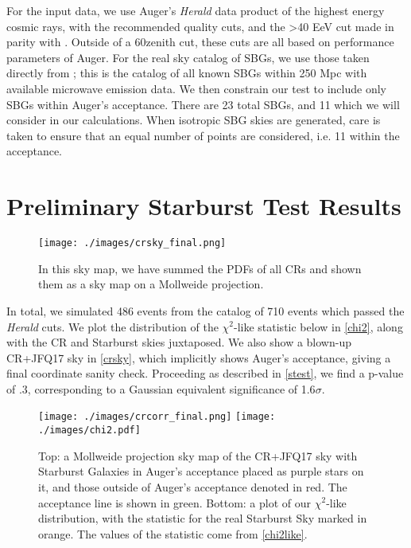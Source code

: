For the input data, we use Auger's \textit{Herald} data product of the highest energy cosmic rays, with the recommended quality cuts, and the \textgreater 40 EeV cut made in parity with . Outside of a 60\degree zenith cut, these cuts are all based on performance parameters of Auger. For the real sky catalog of SBGs, we use those taken directly from \textcite{starburst}; this is the catalog of all known SBGs within 250 Mpc with available microwave emission data. We then constrain our test to include only SBGs within Auger's acceptance. There are 23 total SBGs, and 11 which we will consider in our calculations. When isotropic SBG skies are generated, care is taken to ensure that an equal number of points are considered, i.e. 11 within the acceptance.
%
 
\section{Preliminary Starburst Test Results}%
\begin{figure}[H]
\centering
\texttt{[image: ./images/crsky\_final.png]}
\caption[CR Sky + JFQ17 Modulation]{In this sky map, we have summed the PDFs of all CRs and shown them as a sky map on a Mollweide projection.}
\label{crsky}
\end{figure}
In total, we simulated 486 events from the catalog of 710 events which passed the \textit{Herald} cuts. We plot the distribution of the $\chi^2$-like statistic below in \autoref{chi2}, along with the CR and Starburst skies juxtaposed. We also show a blown-up CR+JFQ17 sky in \autoref{crsky}, which implicitly shows Auger's acceptance, giving a final coordinate sanity check. Proceeding as described in \autoref{stest}, we find a p-value of .3, corresponding to a Gaussian equivalent significance of 1.6$\sigma$. 
\begin{figure}[H]
\centering
\texttt{[image: ./images/crcorr\_final.png]}
\texttt{[image: ./images/chi2.pdf]}
\caption[Starburst Correlation Test]{Top: a Mollweide projection sky map of the CR+JFQ17 sky with Starburst Galaxies in Auger's acceptance placed as purple stars on it, and those outside of Auger's acceptance denoted in red. The acceptance line is shown in green. Bottom: a plot of our $\chi^2$-like distribution, with the statistic for the real Starburst Sky marked in orange. The values of the statistic come from \autoref{chi2like}.}
\label{chi2}
\end{figure}

